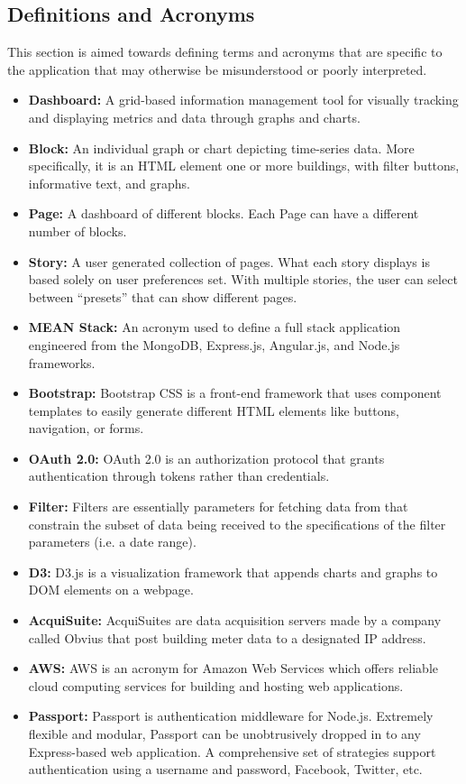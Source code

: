 \documentclass[journal,10pt,onecolumn,compsoc]{IEEEtran}
\begin{document}
    \subsection{Definitions and Acronyms}
    This section is aimed towards defining terms and acronyms that are specific to the application that may otherwise be misunderstood or poorly interpreted.
    \begin{itemize}
        \item \textbf{Dashboard:}
            A grid-based information management tool for visually tracking and displaying metrics and data through graphs and charts.
        \item \textbf{Block:} 
            An individual graph or chart depicting time-series data. More specifically, it is an HTML element one or more buildings, with filter buttons, informative text, and graphs.
        \item \textbf{Page:} 
            A dashboard of different blocks. Each Page can have a different number of blocks.
        \item \textbf{Story:} 
            A user generated collection of pages. What each story displays is based solely on user preferences set. With multiple stories, the user can select between ``presets'' that can show different pages.
        \item \textbf{MEAN Stack:} 
            An acronym used to define a full stack application engineered from the MongoDB, Express.js, Angular.js, and Node.js frameworks. 
        \item \textbf{Bootstrap:} 
            Bootstrap CSS is a front-end framework that uses component templates to easily generate different HTML elements like buttons, navigation, or forms. 
        \item \textbf{OAuth 2.0:} 
            OAuth 2.0 is an authorization protocol that grants authentication through tokens rather than credentials. 
        \item \textbf{Filter:} 
            Filters are essentially parameters for fetching data from that constrain the subset of data being received to the specifications of the filter parameters (i.e. a date range). 
        \item \textbf{D3:} 
            D3.js is a visualization framework that appends charts and graphs to DOM elements on a webpage. 
        \item \textbf{AcquiSuite:} 
            AcquiSuites are data acquisition servers made by a company called Obvius that post building meter data to a designated IP address.
        \item \textbf{AWS:} 
            AWS is an acronym for Amazon Web Services which offers reliable cloud computing services for building and hosting web applications.
	   \item \textbf{Passport:} 
			Passport is authentication middleware for Node.js. Extremely flexible and modular, Passport can be unobtrusively dropped in to any Express-based web application. A comprehensive set of strategies support authentication using a username and password, Facebook, Twitter, etc.
   \end{itemize}
\end{document}
